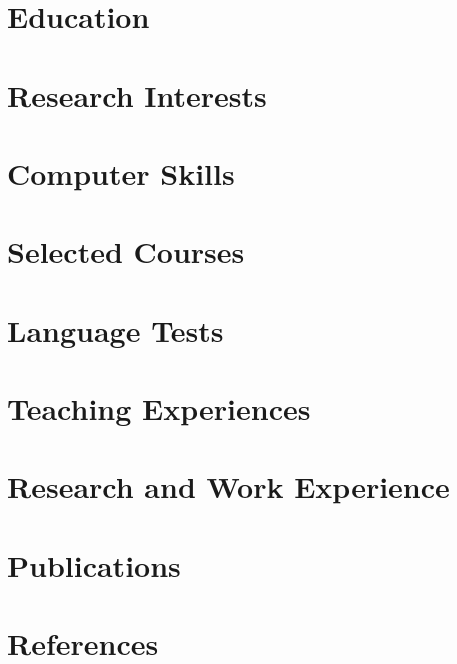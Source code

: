 \documentclass[10pt]{article}
\begin{document}
  \printVersionAndDate
  
  \vspace{-33pt}
  \begin{paracol}{2}
    \section{Education}
      
    \section{Research Interests}
      
    \section{Computer Skills}
      
    \section{Selected Courses}
      
    \section{Language Tests}
    
    \section{Teaching Experiences}
      
    \switchcolumn
%      
    \section{Research and Work Experience}
      
    \section{Publications}
      
    \section{References}
      
  \end{paracol}
\end{document}
